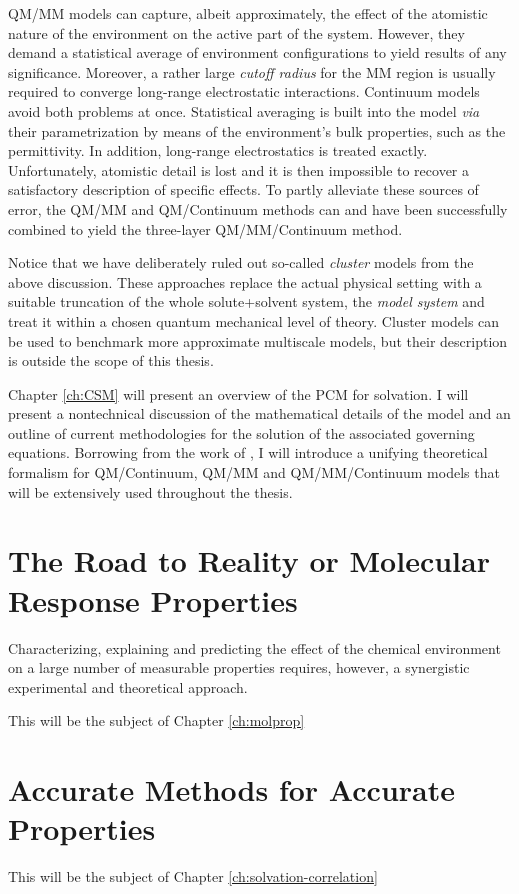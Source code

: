 \acrshort{QM}/\acrshort{MM} models can capture, albeit approximately, the effect
of the atomistic nature of the environment on the active part of the
system.
However, they demand a statistical average of environment configurations
to yield results of any significance. Moreover, a rather large
\emph{cutoff radius} for the \acrshort{MM} region is usually required to converge
long-range electrostatic interactions.\autocite{Steindal2011-ki}
Continuum models avoid both problems at once. Statistical averaging is
built into the model \emph{via} their parametrization by
means of the environment's bulk properties, such as the permittivity.
In addition, long-range electrostatics is treated exactly.
Unfortunately, atomistic detail is lost and it is then impossible to
recover a satisfactory description of specific effects.
To partly alleviate these sources of error, the
\acrshort{QM}/\acrshort{MM} and \acrshort{QM}/Continuum methods can and
have been successfully combined to yield the three-layer
\acrshort{QM}/\acrshort{MM}/Continuum method.\autocite{Steindal2011-ki,
Lipparini2011-rd, Caprasecca2012-ir, Lipparini2013-ud}

Notice that we have deliberately ruled out so-called \emph{cluster}
models from the above discussion.
These approaches replace the actual physical setting with a suitable
truncation of the whole solute+solvent system, the \emph{model system}
and treat it within a chosen quantum mechanical level of theory.
Cluster models can be used to benchmark more approximate multiscale
models, but their description is outside the scope of this thesis.

Chapter \ref{ch:CSM} will present an overview of the \gls{PCM} for
solvation.
I will present a nontechnical discussion of the mathematical details of
the model and an outline of current methodologies for the solution of
the associated governing equations.
Borrowing from the work of \citeauthor{Lipparini2010-be},\autocite{Lipparini2010-be,
Lipparini2015-lq} I will introduce a unifying theoretical formalism for
\acrshort{QM}/Continuum, \acrshort{QM}/\acrshort{MM} and \acrshort{QM}/\acrshort{MM}/Continuum models that will
be extensively used throughout the thesis.

\section*{The Road to Reality or Molecular Response Properties}

Characterizing, explaining and predicting the effect of the chemical
environment on a large number of measurable properties requires,
however, a synergistic experimental and theoretical approach.

This will be the subject of Chapter \ref{ch:molprop}

\section*{Accurate Methods for Accurate Properties}

This will be the subject of Chapter \ref{ch:solvation-correlation}
